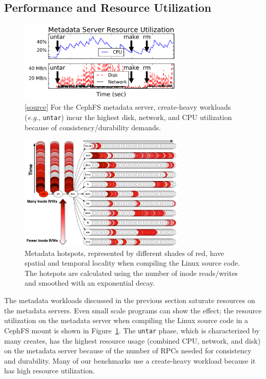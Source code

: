 \subsection{Performance and Resource Utilization}

\begin{figure}[t]
  \centering
  \includegraphics[width=0.7\textwidth]{./chapters/cudele/figures/overhead-creates.png}
  \caption{[\href{https://github.com/michaelsevilla/cudele-popper/blob/master/experiments/baseline-compile/visualize/viz.ipynb}{source}]
  For the CephFS metadata server, create-heavy workloads ({\it e.g.},
  \texttt{untar}) incur the highest disk, network, and CPU utilization because of
  consistency/durability demands.}\label{fig:overhead-creates}
\end{figure}

\begin{figure}[t]
  \centering	
  \includegraphics[width=0.7\textwidth]{./chapters/mantle/figures/workload-tar.png}
  \caption{Metadata hotspots, represented by different shades of red, have
  spatial and temporal locality when compiling the Linux source code. The
  hotspots are calculated using the number of inode reads/writes and
  smoothed with an exponential decay. \label{figure:workload-tar}}
\end{figure}

The metadata workloads discussed in the previous section saturate resources on
the metadata servers.  Even small scale programs can show the effect; the
resource utilization on the metadata server when compiling the Linux source
code in a CephFS mount is shown in Figure~\ref{fig:overhead-creates}.  The
\texttt{untar} phase, which is characterized by many creates, has the highest
resource usage (combined CPU, network, and disk) on the metadata server because
of the number of RPCs needed for consistency and durability.  Many of our
benchmarks use a create-heavy workload because it has high resource
utilization.

